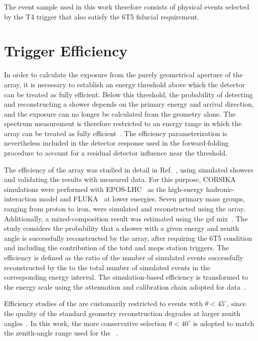 \documentclass[main.tex]{subfiles}
\begin{document}
The event sample used in this work therefore consists of physical events selected by the T4 trigger that also satisfy the 6T5 fiducial requirement.

\section{Trigger Efficiency}
\label{sec:efficiency}

In order to calculate the exposure from the purely geometrical aperture of the array, it is necessary to establish an energy threshold above which the detector can be treated as fully efficient.
Below this threshold, the probability of detecting and reconstructing a shower depends on the primary energy and arrival direction, and the exposure can no longer be calculated from the geometry alone.
The spectrum measurement is therefore restricted to an energy range in which the array can be treated as fully efficient~\cite{PierreAuger:2010:TriggerAperture}.
The efficiency parameterization is nevertheless included in the detector response used in the forward-folding procedure to account for a residual detector influence near the threshold.

The efficiency of the  array was studied in detail in Ref.~\cite{GAP:Rodriguez:2024:Efficiency}, using simulated showers and validating the results with measured data.
For this purpose, CORSIKA simulations were performed with EPOS-LHC~\cite{Pierog:2015:EPOSLHC} as the high-energy hadronic-interaction model and FLUKA~\cite{Battistoni:2008:FLUKA} at lower energies.
Seven primary mass groups, ranging from proton to iron, were simulated and reconstructed using the  array.
Additionally, a mixed-composition result was estimated using the \gls{gsf} mix~\cite{Dembinski:2017:GSF}.
The study considers the probability that a shower with a given energy and zenith angle is successfully reconstructed by the array, after requiring the 6T5 condition and including the contribution of the \gls{totd} and \gls{mops} station triggers.
The efficiency is defined as the ratio of the number of simulated events successfully reconstructed by the  to the total number of simulated events in the corresponding energy interval.
The simulation-based efficiency is transformed to the  energy scale using the attenuation and calibration chain adopted for data~\cite{GAP:Rodriguez:2024:Efficiency}.

Efficiency studies of the  are customarily restricted to events with $\theta<45^\circ$, since the quality of the standard geometry reconstruction degrades at larger zenith angles~\cite{GAP:Rodriguez:2024:Efficiency}.
In this work, the more conservative selection $\theta<40^\circ$ is adopted to match the zenith-angle range used for the ~\cite{PierreAuger:2021:InfillSpectrum}.
\end{document}
